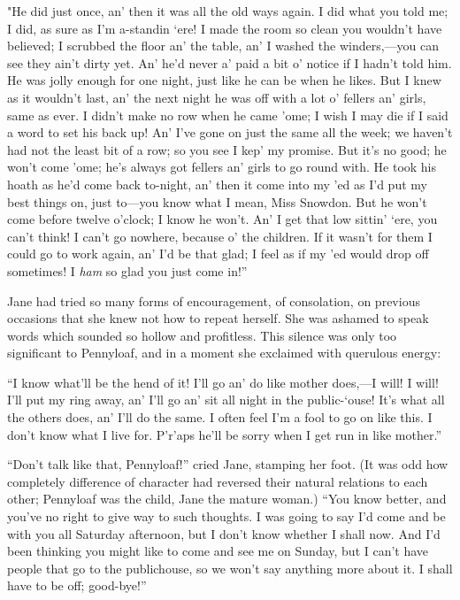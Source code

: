 "He did just once, an' then it was all the old ways again. I did what
you told me; I did, as sure as I'm a-standin `ere! I made the room so
clean you wouldn't have {}believed; I scrubbed the floor an' the table,
an' I washed the winders,---you can see they ain't dirty yet. An' he'd
never a' paid a bit o' notice if I hadn't told him. He was jolly enough
for one night, just like he can be when he likes. But I knew as it
wouldn't last, an' the next night he was off with a lot o' fellers an'
girls, same as ever. I didn't make no row when he came 'ome; I wish I
may die if I said a word to set his back up! An' I've gone on just the
same all the week; we haven't had not the least bit of a row; so you see
I kep' my promise. But it's no good; he won't come 'ome; he's always got
fellers an' girls to go round with. He took his hoath as he'd come back
to-night, an' then it come into my 'ed as I'd put my best things on,
just to---you know what I mean, Miss Snowdon. But he won't come before
twelve o'clock; I know he won't. An' I get that low sittin' `ere, you
can't think! I can't go nowhere, because o' the children. If it wasn't
for them I could go to work again, an' I'd be that glad; I feel as if my
'ed would {}drop off sometimes! I \emph{ham} so glad you just come in!''

Jane had tried so many forms of encouragement, of consolation, on
previous occasions that she knew not how to repeat herself. She was
ashamed to speak words which sounded so hollow and profitless. This
silence was only too significant to Pennyloaf, and in a moment she
exclaimed with querulous energy:

``I know what'll be the hend of it! I'll go an' do like mother does,---I
will! I will! I'll put my ring away, an' I'll go an' sit all night in
the public-`ouse! It's what all the others does, an' I'll do the same. I
often feel I'm a fool to go on like this. I don't know what I live for.
P'r'aps he'll be sorry when I get run in like mother.''

``Don't talk like that, Pennyloaf!'' cried Jane, stamping her foot. (It
was odd how completely difference of character had reversed their
natural relations to each other; Pennyloaf was the child, Jane the
mature woman.) ``You know better, and you've no {}right to give way to
such thoughts. I was going to say I'd come and be with you all Saturday
afternoon, but I don't know whether I shall now. And I'd been thinking
you might like to come and see me on Sunday, but I can't have people
that go to the publichouse, so we won't say anything more about it. I
shall have to be off; good-bye!''

